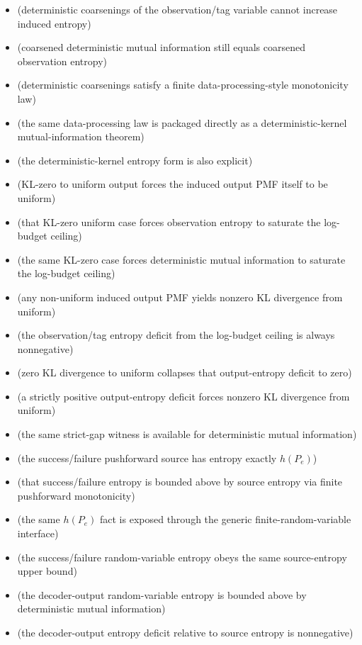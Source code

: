 \begin{itemize}
\item {} (deterministic coarsenings of the observation/tag variable cannot increase induced entropy)
\item {} (coarsened deterministic mutual information still equals coarsened observation entropy)
\item {} (deterministic coarsenings satisfy a finite data-processing-style monotonicity law)
\item {} (the same data-processing law is packaged directly as a deterministic-kernel mutual-information theorem)
\item {} (the deterministic-kernel entropy form is also explicit)
\item {} (KL-zero to uniform output forces the induced output PMF itself to be uniform)
\item {} (that KL-zero uniform case forces observation entropy to saturate the log-budget ceiling)
\item {} (the same KL-zero case forces deterministic mutual information to saturate the log-budget ceiling)
\item {} (any non-uniform induced output PMF yields nonzero KL divergence from uniform)
\item {} (the observation/tag entropy deficit from the log-budget ceiling is always nonnegative)
\item {} (zero KL divergence to uniform collapses that output-entropy deficit to zero)
\item {} (a strictly positive output-entropy deficit forces nonzero KL divergence from uniform)
\item {} (the same strict-gap witness is available for deterministic mutual information)
\item {} (the success/failure pushforward source has entropy exactly $h(P_e)$)
\item {} (that success/failure entropy is bounded above by source entropy via finite pushforward monotonicity)
\item {} (the same $h(P_e)$ fact is exposed through the generic finite-random-variable interface)
\item {} (the success/failure random-variable entropy obeys the same source-entropy upper bound)
\item {} (the decoder-output random-variable entropy is bounded above by deterministic mutual information)
\item {} (the decoder-output entropy deficit relative to source entropy is nonnegative)

\end{itemize}
